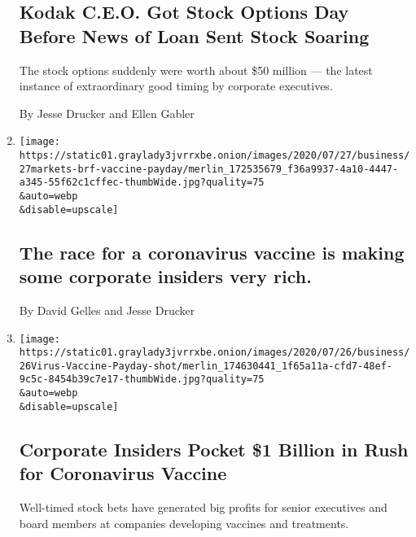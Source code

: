 \begin{enumerate}
{  \subsection{Kodak C.E.O. Got Stock Options Day Before News of Loan
  Sent Stock
  Soaring}\label{kodak-ceo-got-stock-options-day-before-news-of-loan-sent-stock-soaring}}

  The stock options suddenly were worth about \$50 million --- the
  latest instance of extraordinary good timing by corporate executives.

  By Jesse Drucker and Ellen Gabler
\item
  \href{/2020/07/27/business/the-race-for-a-coronavirus-vaccine-is-making-some-corporate-insiders-very-rich.html}{}

  \texttt{[image: https://static01.graylady3jvrrxbe.onion/images/2020/07/27/business/27markets-brf-vaccine-payday/merlin\_172535679\_f36a9937-4a10-4447-a345-55f62c1cffec-thumbWide.jpg?quality=75\\\&auto=webp\\\&disable=upscale]}

  \hypertarget{the-race-for-a-coronavirus-vaccine-is-making-some-corporate-insiders-very-rich}{%
  \subsection{The race for a coronavirus vaccine is making some
  corporate insiders very
  rich.}\label{the-race-for-a-coronavirus-vaccine-is-making-some-corporate-insiders-very-rich}}

  By David Gelles and Jesse Drucker
\item
  \href{/2020/07/25/business/coronavirus-vaccine-profits-vaxart.html}{}

  \texttt{[image: https://static01.graylady3jvrrxbe.onion/images/2020/07/26/business/26Virus-Vaccine-Payday-shot/merlin\_174630441\_1f65a11a-cfd7-48ef-9c5c-8454b39c7e17-thumbWide.jpg?quality=75\\\&auto=webp\\\&disable=upscale]}

  \hypertarget{corporate-insiders-pocket-1-billion-in-rush-for-coronavirus-vaccine}{%
  \subsection{Corporate Insiders Pocket \$1 Billion in Rush for
  Coronavirus
  Vaccine}\label{corporate-insiders-pocket-1-billion-in-rush-for-coronavirus-vaccine}}

  Well-timed stock bets have generated big profits for senior executives
  and board members at companies developing vaccines and treatments.


\end{enumerate}
